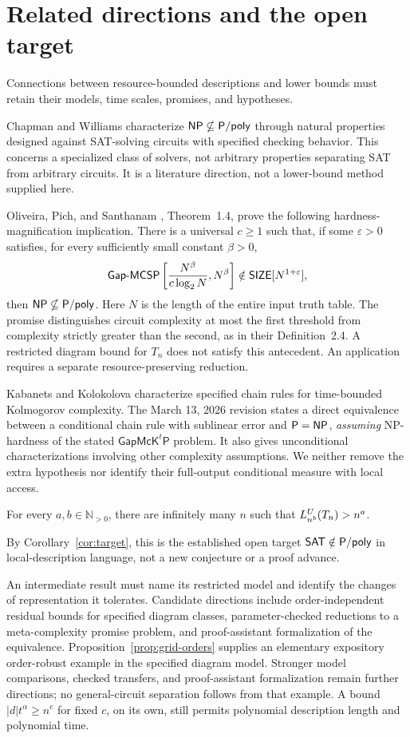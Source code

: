 \section{Related directions and the open target}
Connections between resource-bounded descriptions and lower bounds
must retain their models, time scales, promises, and hypotheses.

Chapman and Williams \cite{ChapmanWilliams2015} characterize
\(\mathsf{NP}\nsubseteq\mathsf{P}/\mathsf{poly}\) through natural properties designed against
SAT-solving circuits with specified checking behavior.
This concerns a specialized class of solvers, not arbitrary
properties separating SAT from arbitrary circuits. It is a
literature direction, not a lower-bound method supplied here.

Oliveira, Pich, and Santhanam \cite{OliveiraPichSanthanam2021},
Theorem~1.4, prove the following hardness-magnification implication.
There is a universal \(c\geq1\) such that, if some \(\varepsilon>0\)
satisfies, for every sufficiently small constant \(\beta>0\),
\[
 \mathsf{Gap\text{-}MCSP}
 \left[\frac{N^\beta}{c\log_2 N},N^\beta\right]
 \notin\mathsf{SIZE}[N^{1+\varepsilon}],
\]
then \(\mathsf{NP}\nsubseteq\mathsf{P}/\mathsf{poly}\).
Here \(N\) is the length of the entire input truth table. The
promise distinguishes circuit complexity at most the first threshold
from complexity strictly greater than the second, as in their Definition~2.4.
A restricted diagram bound for \(T_n\) does not satisfy this
antecedent. An application requires a separate resource-preserving
reduction.

Kabanets and Kolokolova \cite{KabanetsKolokolova2026} characterize
specified chain rules for time-bounded Kolmogorov complexity.
The March 13, 2026 revision states a direct equivalence between a
conditional chain rule with sublinear error and \(\mathsf{P}=\mathsf{NP}\),
\emph{assuming} NP-hardness of the stated
\(\mathsf{GapMcK}^{t}\mathsf P\) problem.
It also gives unconditional characterizations involving other
complexity assumptions. We neither remove the extra hypothesis nor
identify their full-output conditional measure with local access.

\begin{conjecture}
\label{conj:main}
For every \(a,b\in\mathbb N_{>0}\), there are infinitely many \(n\)
such that \(L^{U}_{n^b}(T_n)>n^a\).
\end{conjecture}
By Corollary~\ref{cor:target}, this is the established open target
\(\mathsf{SAT}\notin\mathsf{P}/\mathsf{poly}\) in local-description language, not a new
conjecture or a proof advance.

An intermediate result must name its restricted model and identify
the changes of representation it tolerates. Candidate directions
include order-independent residual bounds for specified diagram
classes, parameter-checked reductions to a meta-complexity promise
problem, and proof-assistant formalization of the equivalence.
Proposition~\ref{prop:grid-orders} supplies an elementary expository
order-robust example in the specified diagram model. Stronger model
comparisons, checked transfers, and proof-assistant formalization remain
further directions; no general-circuit separation follows from that example.
A bound \(|d|t^\alpha\geq n^c\) for fixed \(c\), on its own, still
permits polynomial description length and polynomial time.
